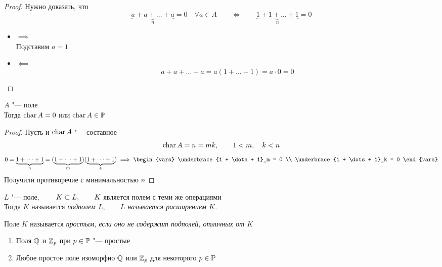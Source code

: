 \begin{proof}
	Нужно доказать, что
	$$ \underbrace{a + a + \dots + a}_n = 0 \quad \forall a \in A \qquad \iff \qquad \underbrace{1 + 1 + \dots + 1}_n = 0 $$
	\begin{itemize}
		\item $ \implies $ \\
		Подставим $ a = 1 $
		\item $ \impliedby $
		$$ a + a + \dots + a = a(1 + \dots + 1) = a \cdot 0 = 0 $$
	\end{itemize}
\end{proof}

\begin{property}
	$ A $ "--- поле \\
	Тогда $ \operatorname{char} A = 0 $ или $ \operatorname{char} A \in \mathbb{P} $
\end{property}

\begin{proof}
	Пусть  и $ \operatorname{char} A $ "--- составное
	$$ \operatorname{char} A = n = mk, \qquad 1 < m, \quad k < n $$
	$$ 0 = \underbrace{1 + \dots + 1}_n = (\underbrace{1 + \dots + 1}_m)(\underbrace{1 + \dots + 1}_k) \implies
	\begin{vars}
		\underbrace{1 + \dots + 1}_m = 0 \\
		\underbrace{1 + \dots + 1}_k = 0
	\end{vars} $$
	Получили противоречие с минимальностью $ n $
\end{proof}

\begin{definition}
	$ L $ "--- поле, $ \qquad K \subset L, \qquad K $ является полем с теми же операциями \\
	Тогда $ K $ называется \it{подполем} $ L, \qquad L $ называется \it{расширением} $ K $.
\end{definition}

\begin{definition}
	Поле $ K $ называется \it{простым}, если оно не содержит подполей, отличных от $ K $
\end{definition}

\begin{theorem}
	\hfill
	\begin{enumerate}
		\item Поля $ \mathbb{Q} $ и $ \mathbb{Z}_p $ при $ p \in \mathbb{P} $ "--- простые

		\item Любое простое поле изоморфно $ \mathbb{Q} $ или $ \mathbb{Z}_p $ для некоторого $ p \in \mathbb{P} $
	\end{enumerate}
\end{theorem}

